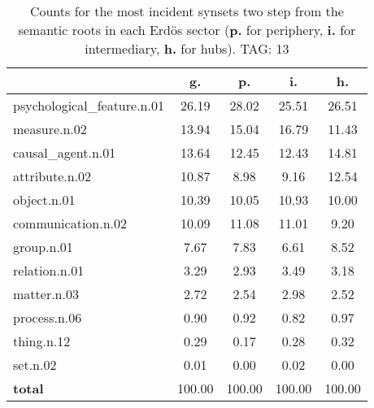 \begin{table}[h!]
\begin{center}
\begin{tabular}{| l || c | c | c | c |}\hline
 & {\bf g.} & {\bf p.} & {\bf i.} & {\bf h.} \\\hline\hline
psychological\_feature.n.01 & 26.19  & 28.02  & 25.51  & 26.51 \\\hline
measure.n.02 & 13.94  & 15.04  & 16.79  & 11.43 \\\hline
causal\_agent.n.01 & 13.64  & 12.45  & 12.43  & 14.81 \\\hline
attribute.n.02 & 10.87  & 8.98  & 9.16  & 12.54 \\\hline
object.n.01 & 10.39  & 10.05  & 10.93  & 10.00 \\\hline
communication.n.02 & 10.09  & 11.08  & 11.01  & 9.20 \\\hline
group.n.01 & 7.67  & 7.83  & 6.61  & 8.52 \\\hline
relation.n.01 & 3.29  & 2.93  & 3.49  & 3.18 \\\hline
matter.n.03 & 2.72  & 2.54  & 2.98  & 2.52 \\\hline
process.n.06 & 0.90  & 0.92  & 0.82  & 0.97 \\\hline
thing.n.12 & 0.29  & 0.17  & 0.28  & 0.32 \\\hline
set.n.02 & 0.01  & 0.00  & 0.02  & 0.00 \\\hline\hline
{{\bf total}} & 100.00  & 100.00  & 100.00  & 100.00 \\\hline
\end{tabular}
\caption{Counts for the most incident synsets two step from the semantic roots in each Erd\"os sector ({\bf p.} for periphery, {\bf i.} for intermediary, {\bf h.} for hubs). TAG: 13}
\end{center}
\end{table}